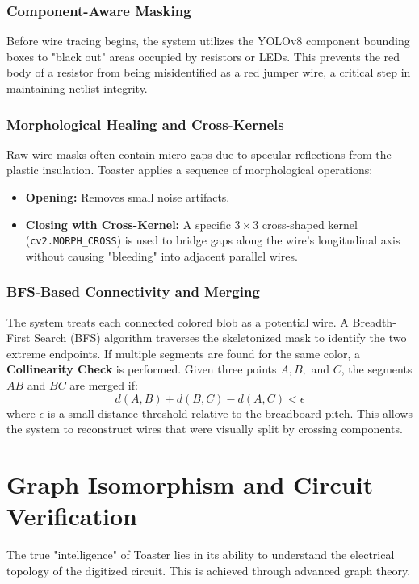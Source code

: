 \documentclass[11pt,a4paper]{article}
\begin{document}
\subsubsection{Component-Aware Masking}
Before wire tracing begins, the system utilizes the YOLOv8 component bounding boxes to "black out" areas occupied by resistors or LEDs. This prevents the red body of a resistor from being misidentified as a red jumper wire, a critical step in maintaining netlist integrity.

\subsubsection{Morphological Healing and Cross-Kernels}
Raw wire masks often contain micro-gaps due to specular reflections from the plastic insulation. Toaster applies a sequence of morphological operations:
\begin{itemize}
    \item \textbf{Opening:} Removes small noise artifacts.
    \item \textbf{Closing with Cross-Kernel:} A specific $3 \times 3$ cross-shaped kernel (\texttt{cv2.MORPH\_CROSS}) is used to bridge gaps along the wire's longitudinal axis without causing "bleeding" into adjacent parallel wires.
\end{itemize}

\subsubsection{BFS-Based Connectivity and Merging}
The system treats each connected colored blob as a potential wire. A Breadth-First Search (BFS) algorithm traverses the skeletonized mask to identify the two extreme endpoints. If multiple segments are found for the same color, a \textbf{Collinearity Check} is performed. Given three points $A, B,$ and $C$, the segments $AB$ and $BC$ are merged if:
\begin{equation}
    d(A, B) + d(B, C) - d(A, C) < \epsilon
\end{equation}
where $\epsilon$ is a small distance threshold relative to the breadboard pitch. This allows the system to reconstruct wires that were visually split by crossing components.

\newpage

\section{Graph Isomorphism and Circuit Verification}
The true "intelligence" of Toaster lies in its ability to understand the electrical topology of the digitized circuit. This is achieved through advanced graph theory.
\end{document}
